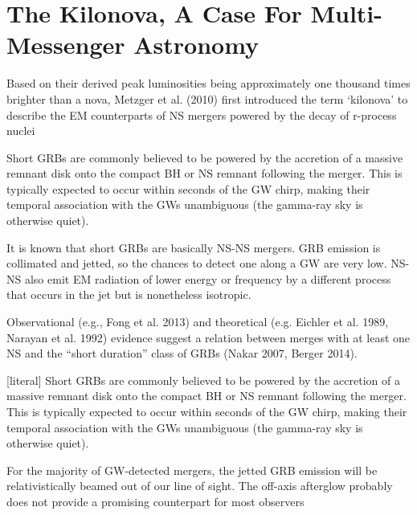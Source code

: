 \chapter{The Kilonova, A Case For Multi-Messenger Astronomy} \label{kilonovachapter}


Based on their derived peak luminosities being approximately one thousand times brighter than a nova, Metzger et al. (2010) first introduced the term `kilonova' to describe the EM counterparts of NS mergers powered by the decay of r-process nuclei


Short GRBs are commonly believed to be powered by the accretion of a massive remnant disk onto the compact BH or NS remnant following the merger. This is typically expected to occur within seconds of the GW chirp, making their temporal association with the GWs unambiguous (the gamma-ray sky is otherwise quiet).

It is known that short GRBs are basically NS-NS mergers.
GRB emission is collimated and jetted, so the chances to detect one along a GW are very low.
NS-NS also emit EM radiation of lower energy or frequency by a different process that occurs in the jet but is nonetheless isotropic. 

Observational (e.g., Fong et al. 2013) and theoretical (e.g. Eichler et al. 1989, Narayan et al. 1992) evidence suggest a relation between merges with at least one NS and the ``short duration'' class of GRBs (Nakar 2007, Berger 2014). 


[literal] Short GRBs are commonly believed to be powered by the accretion of a massive remnant disk onto the compact BH or NS remnant following the merger. This is typically expected to occur within seconds of the GW chirp, making their temporal association with the GWs unambiguous (the gamma-ray sky is otherwise quiet).

For the majority of GW-detected mergers, the jetted GRB emission will be relativistically beamed out of our line of sight.
The off-axis afterglow probably does not provide a promising counterpart for most observers

